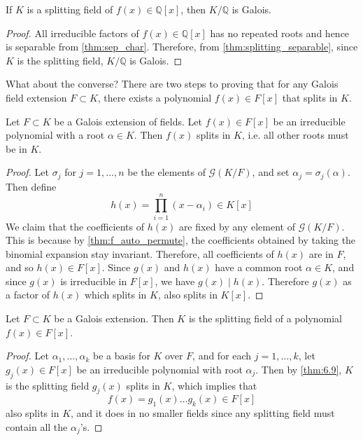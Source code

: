   \begin{corollary}
    If $K$ is a splitting field of $f(x) \in \mathbb{Q}[x]$, then $K/\mathbb{Q}$ is Galois. 
  \end{corollary}
  \begin{proof}
    All irreducible factors of $f(x) \in \mathbb{Q}[x]$ has no repeated roots and hence is separable from \ref{thm:sep_char}. Therefore, from \ref{thm:splitting_separable}, since $K$ is the splitting field, $K/\mathbb{Q}$ is Galois. 
  \end{proof}

  What about the converse? There are two steps to proving that for any Galois field extension $F \subset K$, there exists a polynomial $f(x) \in F[x]$ that splits in $K$. 

  \begin{lemma} 
    \label{thm:6.9}
    Let $F \subset K$ be a Galois extension of fields. Let $f(x) \in F[x]$ be an irreducible polynomial with a root $\alpha \in K$. Then $f(x)$ splits in $K$, i.e. all other roots must be in $K$.  
  \end{lemma} 
  \begin{proof}
    Let $\sigma_j$ for $j = 1, \ldots, n$ be the elements of $\mathcal{G}(K/F)$, and set $\alpha_j = \sigma_j (\alpha)$. Then define 
    \begin{equation}
      h(x) = \prod_{i=1}^n (x - \alpha_i)  \in K[x]
    \end{equation}
    We claim that the coefficients of $h(x)$ are fixed by any element of $\mathcal{G}(K/F)$. This is because by \ref{thm:f_auto_permute}, the coefficients obtained by taking the binomial expansion stay invariant. Therefore, all coefficients of $h(x)$ are in $F$, and so $h(x) \in F[x]$. Since $g(x)$ and $h(x)$ have a common root $\alpha \in K$, and since $g(x)$ is irreducible in $F[x]$, we have $g(x) \mid h(x)$. Therefore $g(x)$ as a factor of $h(x)$ which splits in $K$, also splits in $K[x]$. 
  \end{proof}

  \begin{theorem}
    Let $F \subset K$ be a Galois extension. Then $K$ is the splitting field of a polynomial $f(x) \in F[x]$. 
  \end{theorem}
  \begin{proof}
    Let $\alpha_1, \ldots, \alpha_k$ be a basis for $K$ over $F$, and for each $j = 1, \ldots, k$, let $g_j (x) \in F[x]$ be an irreducible polynomial with root $\alpha_j$. Then by \ref{thm:6.9}, $K$ is the splitting field $g_j(x)$ splits in $K$, which implies that 
    \begin{equation}
      f(x) = g_1 (x) \ldots g_k(x) \in F[x]
    \end{equation}
    also splits in $K$, and it does in no smaller fields since any splitting field must contain all the $\alpha_j$'s. 
  \end{proof}

